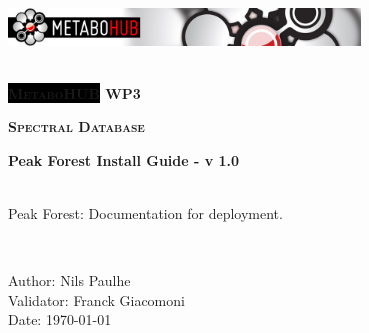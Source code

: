 
\begin{titlepage}

\begin{center}

\includegraphics[width=0.7\textwidth]{./files/images/mth_title.jpg}\\[1cm] 

\HRule \\[0.4cm]
\begin{center} { \textsc{\large { \huge \bfseries \colorbox{Black}{\color{White}Metabo{\color{mthRed}HUB}} WP3 \\}} } \end{center} %
\begin{center} { \textsc{\large { \huge \bfseries Spectral Database}} } \end{center} %
\begin{center} { \huge \bfseries Peak Forest Install Guide - v 1.0} \end{center} 

\HRule \\[0.4cm]

 \large Peak Forest: Documentation for deployment.

\HRule \\[1.5cm]

\begin{flushleft}
 \large
Author: Nils Paulhe \\[\baselineskip]
Validator: Franck Giacomoni \\[\baselineskip]
Date: \today

\let\thefootnote\relax
{}

\end{flushleft}

\vfill

\end{center}

\end{titlepage}